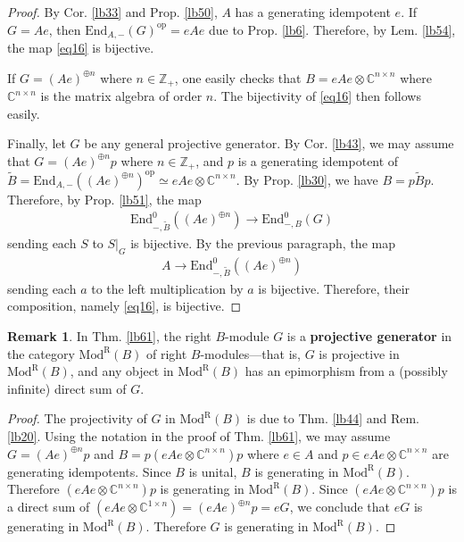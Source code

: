 \documentclass[11pt,b5paper,notitlepage]{article}
\theoremstyle{definition}
\newtheorem{rem}[df]{Remark}
\theoremstyle{plain}
\newcommand{\wtd}{\widetilde}
\newcommand{\End}{\mathrm{End}} %
\newcommand{\opp}{\mathrm{op}}
\newcommand{\Cbb}{\mathbb C}
\newcommand{\Zbb}{\mathbb Z}
\newcommand{\ModR}{\mathrm{Mod}^{\mathrm R}}
\numberwithin{equation}{section}
\begin{document}
\begin{proof}
By Cor. \ref{lb33} and Prop. \ref{lb50}, $A$ has a generating idempotent $e$. If $G=Ae$, then $\End_{A,-}(G)^\opp=eAe$ due to Prop. \ref{lb6}. Therefore, by Lem. \ref{lb54}, the map \eqref{eq16} is bijective.

If $G=(Ae)^{\oplus n}$ where $n\in\Zbb_+$, one easily checks that $B=eAe\otimes\Cbb^{n\times n}$ where $\Cbb^{n\times n}$ is the matrix algebra of order $n$. The bijectivity of \eqref{eq16} then follows easily.

Finally, let $G$ be any general projective generator. By Cor. \ref{lb43}, we may assume that $G=(Ae)^{\oplus n}p$ where $n\in\Zbb_+$, and $p$ is a generating idempotent of $\wtd B=\End_{A,-}((Ae)^{\oplus n})^\opp\simeq eAe\otimes\Cbb^{n\times n}$. By Prop. \ref{lb30}, we have $B=p\wtd Bp$. Therefore, by Prop. \ref{lb51}, the map 
\begin{align*}
\End^0_{-,\wtd B}((Ae)^{\oplus n})\rightarrow \End^0_{-,B}(G)
\end{align*}
sending each $S$ to $S|_G$ is bijective. By the previous paragraph, the map
\begin{align*}
A\rightarrow \End^0_{-,\wtd B}((Ae)^{\oplus n})
\end{align*}
sending each $a$ to the left multiplication by $a$ is bijective. Therefore, their composition, namely \eqref{eq16}, is bijective.
\end{proof}


\begin{rem}\label{lb62}
In Thm. \ref{lb61}, the right $B$-module $G$ is a \textbf{projective generator} in the category $\ModR(B)$ of right $B$-modules---that is, $G$ is projective in $\ModR(B)$, and any object in $\ModR(B)$ has an epimorphism from a (possibly infinite) direct sum of $G$.
\end{rem}

\begin{proof}
The projectivity of $G$ in $\ModR(B)$ is due to Thm. \ref{lb44} and Rem. \ref{lb20}. Using the notation in the proof of Thm. \ref{lb61}, we may assume $G=(Ae)^{\oplus n}p$ and $B=p(eAe\otimes\Cbb^{n\times n})p$ where $e\in A$ and $p\in eAe\otimes\Cbb^{n\times n}$ are generating idempotents. Since $B$ is unital, $B$ is generating in $\ModR(B)$. Therefore $(eAe\otimes\Cbb^{n\times n})p$ is generating in $\ModR(B)$. Since $(eAe\otimes\Cbb^{n\times n})p$  is a direct sum of $(eAe\otimes\Cbb^{1\times n})=(eAe)^{\oplus n}p=eG$, we conclude that $eG$ is generating in $\ModR(B)$. Therefore $G$ is generating in $\ModR(B)$.
\end{proof}
\end{document}
